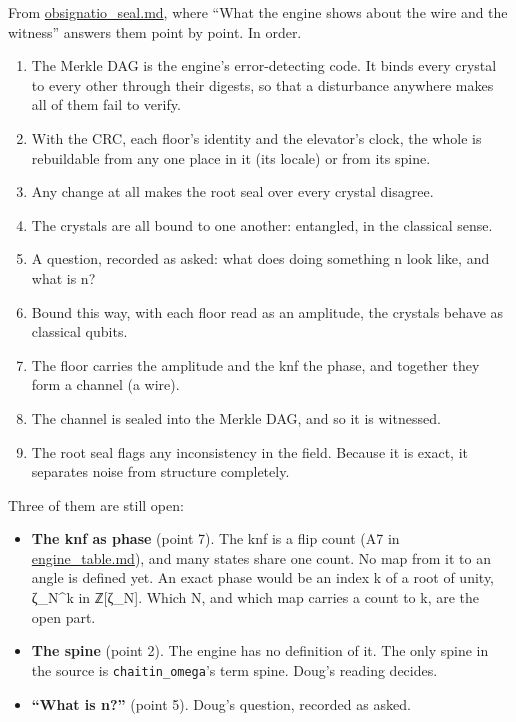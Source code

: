 From \hyperref[chap:obsignatio-seal]{obsignatio\_\allowbreak{}seal.md}, where “What the engine shows about the wire and the witness” answers them point by point. In order.

\begin{enumerate}
\item The Merkle DAG is the engine's error-detecting code. It binds every crystal to every other through their digests, so that a disturbance anywhere makes all of them fail to verify.
\item With the CRC, each floor's identity and the elevator's clock, the whole is rebuildable from any one place in it (its locale) or from its spine.
\item Any change at all makes the root seal over every crystal disagree.
\item The crystals are all bound to one another: entangled, in the classical sense.
\item A question, recorded as asked: what does doing something n look like, and what is n?
\item Bound this way, with each floor read as an amplitude, the crystals behave as classical qubits.
\item The floor carries the amplitude and the knf the phase, and together they form a channel (a wire).
\item The channel is sealed into the Merkle DAG, and so it is witnessed.
\item The root seal flags any inconsistency in the field. Because it is exact, it separates noise from structure completely.
\end{enumerate}

Three of them are still open:

\begin{itemize}
\item \textbf{The knf as phase} (point 7). The knf is a flip count (A7 in \hyperref[chap:engine-table]{engine\_\allowbreak{}table.md}), and many states share one count. No map from it to an angle is defined yet. An exact phase would be an index k of a root of unity, ζ\_\allowbreak{}N\textasciicircum{}k in ℤ[ζ\_\allowbreak{}N]. Which N, and which map carries a count to k, are the open part.
\item \textbf{The spine} (point 2). The engine has no definition of it. The only spine in the source is \texttt{chaitin\_\allowbreak{}omega}'s term spine. Doug's reading decides.
\item \textbf{“What is n?”} (point 5). Doug's question, recorded as asked.
\end{itemize}

